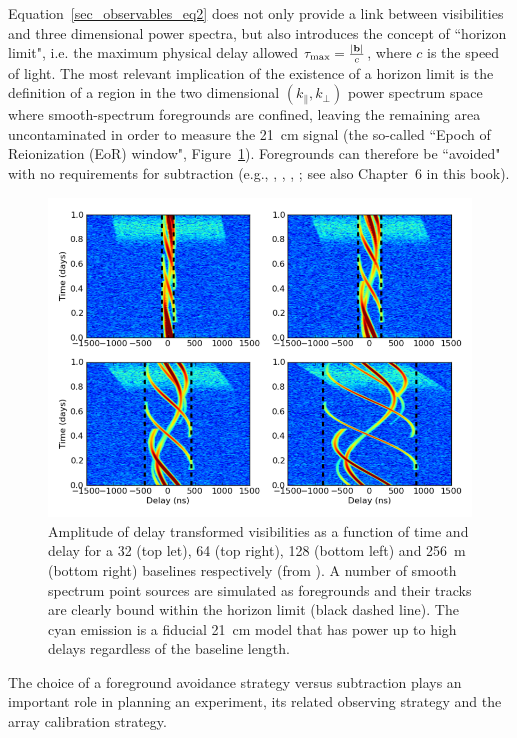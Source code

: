 Equation~\ref{sec_observables_eq2} does not only provide a link between visibilities and three dimensional power spectra, but also introduces the concept of ``horizon limit", i.e. the maximum physical delay allowed $\tau_{\rm max} = \frac{|{\bf b}|}{c}$, where $c$ is the speed of light. The most relevant implication of the existence of a horizon limit is the definition of a region in the two dimensional $(k_\parallel,k_\perp)$ power spectrum space where smooth-spectrum foregrounds are confined, leaving the remaining area  uncontaminated in order to measure the 21~cm signal (the so-called ``Epoch of Reionization (EoR) window", Figure~\ref{fig:fig2}). Foregrounds can therefore be ``avoided" with no requirements for subtraction (e.g., \cite{morales12}, \cite{vedantham12}, \cite{pober13}, \cite{thyagarajan13}; see also Chapter~6 in this book).
\begin{figure}[]
\begin{center}
\includegraphics[width=1.\textwidth]{Bernardi/delay_transform}
\end{center}
\caption{Amplitude of delay transformed visibilities as a function of time and delay for a 32 (top let), 64 (top right), 128 (bottom left) and 256~m (bottom right) baselines respectively (from \cite{parsons12a}). A number of smooth spectrum point sources are simulated as foregrounds and their tracks are clearly bound within the horizon limit (black dashed line). The cyan emission is a fiducial 21~cm model that has power up to high delays regardless of the baseline length.}
\label{fig:fig2}
\end{figure}
The choice of a foreground avoidance strategy versus subtraction plays an important role in planning an experiment, its related observing strategy and the array calibration strategy.

